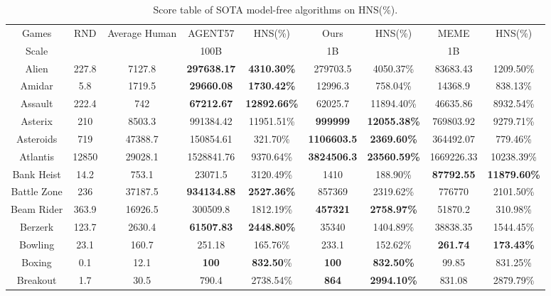 \clearpage


\begin{table}[!hb]
\footnotesize
\begin{center}
\caption{Score table of  SOTA  model-free algorithms on HNS(\%).}
\label{Tab:Score table of SOTA  model-free algorithms on HNS.}
\setlength{\tabcolsep}{1.0pt}
\begin{tabular}{c c c c c c c cc}
\toprule
Games & RND & Average Human & AGENT57 & HNS(\%) & Ours & HNS(\%) & MEME & HNS(\%) \\
        Scale & ~ & ~ & 100B & ~ & 1B & ~ & 1B & ~\\ \midrule
        Alien & 227.8 & 7127.8 & \textbf{297638.17} & \textbf{4310.30\%} & 279703.5 & 4050.37\% & 83683.43&	1209.50\%\\  
        Amidar & 5.8 & 1719.5 & \textbf{29660.08} & \textbf{1730.42\%} & 12996.3 & 758.04\%  & 14368.9	&838.13\%\\  
        Assault & 222.4 & 742 & \textbf{67212.67} & \textbf{12892.66\%} & 62025.7 & 11894.40\% & 46635.86	& 8932.54\%\\  
        Asterix & 210 & 8503.3 & 991384.42 & 11951.51\% & \textbf{999999} & \textbf{12055.38\%} & 769803.92	& 9279.71\%\\  
        Asteroids & 719 & 47388.7 & 150854.61 & 321.70\% & \textbf{1106603.5} & \textbf{2369.60\%} & 364492.07	& 779.46\%\\  
        Atlantis & 12850 & 29028.1 & 1528841.76 & 9370.64\% & \textbf{3824506.3} & \textbf{23560.59\%} & 1669226.33	& 10238.39\%\\  
        Bank Heist & 14.2 & 753.1 & 23071.5& 3120.49\% & 1410 & 188.90\% & \textbf{87792.55}	& \textbf{11879.60\%}\\  
        Battle Zone & 236 & 37187.5 & \textbf{934134.88} & \textbf{2527.36\%} & 857369 & 2319.62\% & 776770	& 2101.50\%\\  
        Beam Rider & 363.9 & 16926.5 & 300509.8 & 1812.19\% & \textbf{457321} & \textbf{2758.97\%} & 51870.2 &	310.98\%\\  
        Berzerk & 123.7 & 2630.4 & \textbf{61507.83} & \textbf{2448.80\%} & 35340 & 1404.89\% & 38838.35	& 1544.45\%\\  
        Bowling & 23.1 & 160.7 & 251.18 & 165.76\% & 233.1 & 152.62\% & \textbf{261.74} &	\textbf{173.43\%}\\  
        Boxing & 0.1 & 12.1 & \textbf{100} & \textbf{832.50}\% & \textbf{100} & \textbf{832.50\%} & 99.85 &	831.25\%\\  
        Breakout & 1.7 & 30.5 & 790.4 & 2738.54\% & \textbf{864} & \textbf{2994.10\%} & 831.08 &	2879.79\% \\  

\end{tabular}
\end{center}
\end{table}
